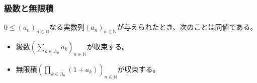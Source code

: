 \documentclass[dvipdfmx]{jsarticle}
\begin{document}
\subsubsection{級数と無限積}%
\begin{thm}\label{4.3.4.3}
$0 \leq \left( a_{n} \right)_{n \in \mathbb{N}}$なる実数列$\left( a_{n} \right)_{n \in \mathbb{N}}$が与えられたとき、次のことは同値である。
\begin{itemize}
\item
  級数$\left( \sum_{k \in \varLambda_{n}} a_{k} \right)_{n \in \mathbb{N}}$が収束する。
\item
  無限積$\left( \prod_{k \in \varLambda_{n}} \left( 1 + a_{k} \right) \right)_{n \in \mathbb{N}}$が収束する。
\end{itemize}
\end{thm}
\end{document}
